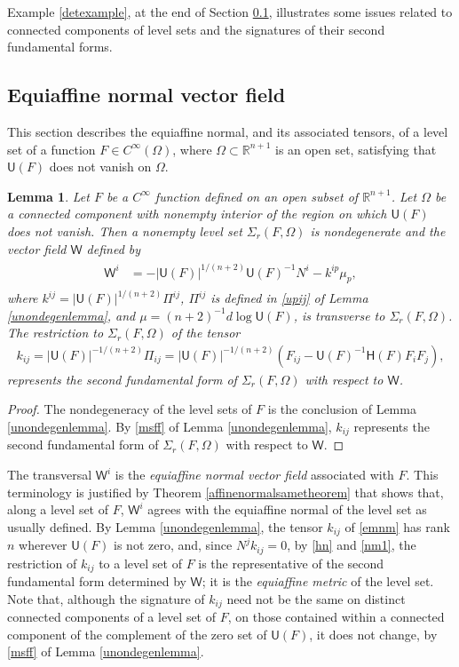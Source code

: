 \documentclass [leqno, 10pt]{amsart}
\newtheorem{lemma}[theorem]{Lemma}
\theoremstyle{definition}
\numberwithin{equation}{section}
\newcommand{\muf}{\mu}
\newcommand{\Om}{\Omega}
\newcommand{\U}{\mathsf{U}}
\newcommand{\lc}{\Sigma}
\renewcommand{\H}{\mathsf{H}}
\newcommand{\sff}{\Pi}
\newcommand{\nm}{\mathsf{W}}
\newcommand{\cinf}{C^{\infty}}
\newcommand{\rea}{\mathbb R}
\begin{document}
Example \ref{detexample}, at the end of Section \ref{equiaffinenormalsection}, illustrates some issues related to connected components of level sets and the signatures of their second fundamental forms.

\subsection{Equiaffine normal vector field}\label{equiaffinenormalsection}
This section describes the equiaffine normal, and its associated tensors, of a level set of a function $F \in \cinf(\Om)$, where $\Om \subset \rea^{n+1}$ is an open set, satisfying that $\U(F)$ does not vanish on $\Om$.

\begin{lemma}\label{affinenormaldefinitionlemma} 
Let $F$ be a $\cinf$ function defined on an open subset of $\rea^{n+1}$. Let $\Omega$ be a connected component with nonempty interior of the region on which $\U(F)$ does not vanish. Then a nonempty level set $\lc_{r}(F, \Om)$ is nondegenerate and the vector field $\nm$ defined by
\begin{align}\label{nmdefined}
\begin{split}
\nm^{i} &= -|\U(F)|^{1/(n+2)}\U(F)^{-1}N^{i} - k^{ip}\muf_{p},
\end{split}
\end{align}
where  $k^{ij} = |\U(F)|^{1/(n+2)}\sff^{ij}$, $\sff^{ij}$ is defined in \eqref{upij} of Lemma \ref{unondegenlemma}, and $\muf = (n+2)^{-1}d\log\U(F)$, is transverse to $\lc_{r}(F, \Om)$. The restriction to $\lc_{r}(F, \Om)$ of the tensor 
\begin{align}\label{emnm}
k_{ij} = |\U(F)|^{-1/(n+2)}\sff_{ij} = |\U(F)|^{-1/(n+2)}(F_{ij} - \U(F)^{-1}\H(F)F_{i}F_{j}),
\end{align}
represents the second fundamental form of $\lc_{r}(F, \Om)$ with respect to $\nm$. 
\end{lemma}
\begin{proof}
The nondegeneracy of the level sets of $F$ is the conclusion of Lemma \ref{unondegenlemma}. By \eqref{msff} of Lemma \ref{unondegenlemma}, $k_{ij}$ represents the second fundamental form of $\lc_{r}(F, \Om)$ with respect to $\nm$. 
\end{proof}

The transversal $\nm^{i}$ is the \textit{equiaffine normal vector field} associated with $F$. This terminology is justified by Theorem \ref{affinenormalsametheorem} that shows that, along a level set of $F$, $\nm^{i}$ agrees with the equiaffine normal of the level set as usually defined. By Lemma \ref{unondegenlemma}, the tensor $k_{ij}$ of \eqref{emnm} has rank $n$ wherever $\U(F)$ is not zero, and, since $N^{j}k_{ij} = 0$, by \eqref{hn} and \eqref{nm1}, the restriction of $k_{ij}$ to a level set of $F$ is the representative of the second fundamental form determined by $\nm$; it is the \textit{equiaffine metric} of the level set. Note that, although the signature of $k_{ij}$ need not be the same on distinct connected components of a level set of $F$, on those contained within a connected component of the complement of the zero set of $\U(F)$, it does not change, by \eqref{msff} of Lemma \ref{unondegenlemma}.
\end{document}
